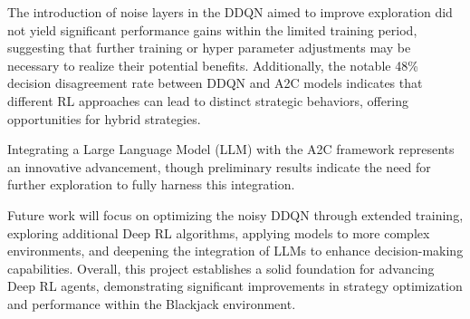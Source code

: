 \documentclass[compsoc]{IEEEtran}
\begin{document}
{{{The introduction of noise layers in the DDQN aimed to improve exploration did not yield significant performance gains within the limited training period, suggesting that further training or hyper parameter adjustments may be necessary to realize their potential benefits. Additionally, the notable 48\% decision disagreement rate between DDQN and A2C models indicates that different RL approaches can lead to distinct strategic behaviors, offering opportunities for hybrid strategies.

Integrating a Large Language Model (LLM) with the A2C framework represents an innovative advancement, though preliminary results indicate the need for further exploration to fully harness this integration. 

Future work will focus on optimizing the noisy DDQN through extended training, exploring additional Deep RL algorithms, applying models to more complex environments, and deepening the integration of LLMs to enhance decision-making capabilities. Overall, this project establishes a solid foundation for advancing Deep RL agents, demonstrating significant improvements in strategy optimization and performance within the Blackjack environment.




%
%

\begin{thebibliography}{12}


\end{thebibliography}}}}
\end{document}
